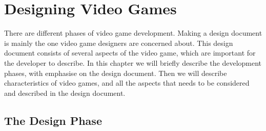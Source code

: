 \chapter{Designing Video Games} 
\label{chap:vg}
There are different phases of video game development. Making a design document is mainly the one video game designers are concerned about. This design document consists of several aspects of the video game, which are important for the developer to describe. In this chapter we will briefly describe the development phases, with emphasise on the design document. Then we will describe characteristics of video games, and all the aspects that needs to be considered and described in the design document. 

\section{The Design Phase}

